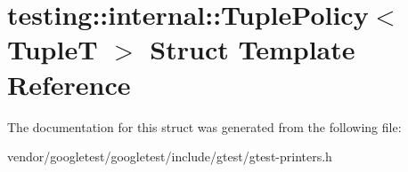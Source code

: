 \hypertarget{structtesting_1_1internal_1_1_tuple_policy}{}\section{testing\+:\+:internal\+:\+:Tuple\+Policy$<$ TupleT $>$ Struct Template Reference}
\label{structtesting_1_1internal_1_1_tuple_policy}


The documentation for this struct was generated from the following file\+:\begin{DoxyCompactItemize}
\item 
vendor/googletest/googletest/include/gtest/gtest-\/printers.\+h\end{DoxyCompactItemize}
